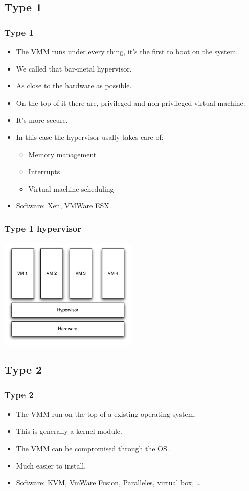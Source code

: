 \subsection{Type 1}
\begin{frame}
\frametitle{Type 1}
\begin{itemize}
\item The VMM runs under every thing, it's the first to boot on the
system.
\item We called that bar-metal hypervisor.
\item As close to the hardware as possible.
\item On the top of it there are, privileged and non privileged virtual
machine.
\item It's more secure.
\item In this case the hypervisor usally takes care of:
\begin{itemize}
\item Memory management
\item Interrupts
\item Virtual machine scheduling
\end{itemize}
\item Software: Xen, VMWare ESX.
\end{itemize}
\end{frame}

\begin{frame}
\begin{center}
\frametitle{Type 1 hypervisor}
\includegraphics[height=150pt]{figures/type_1}
\end{center}
\end{frame}


\subsection{Type 2}
\begin{frame}
\frametitle{Type 2}
\begin{itemize}
\item The VMM run on the top of a existing operating system.
\item This is generally a kernel module.
\item The VMM can be compromised through the OS.
\item Much easier to install.
\item Software: KVM, VmWare Fusion, Paralleles, virtual box, \ldots
\end{itemize}
\end{frame}

